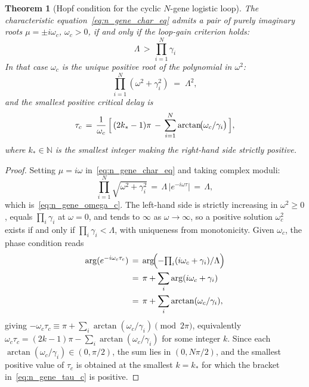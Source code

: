 \documentclass[sn-mathphys,Numbered]{sn-jnl}
\theoremstyle{thmstyleone}
\newtheorem{theorem}{Theorem}
\theoremstyle{thmstyletwo}
\theoremstyle{thmstylethree}
\begin{document}
\begin{theorem}[Hopf condition for the cyclic $N$-gene logistic loop]
\label{thm:n_gene_hopf}
The characteristic equation~\eqref{eq:n_gene_char_eq} admits a pair of
purely imaginary roots $\mu=\pm i\omega_c$, $\omega_c>0$, if and only
if the loop-gain criterion holds:
\begin{equation}
\boxed{\;\Lambda \,>\, \prod_{i=1}^N \gamma_i\;}
\label{eq:n_gene_hopf_crit}
\end{equation}
In that case $\omega_c$ is the unique positive root of the polynomial
in $\omega^2$:
\begin{equation}
\prod_{i=1}^N (\omega^2 + \gamma_i^2) \;=\; \Lambda^2,
\label{eq:n_gene_omega_c}
\end{equation}
and the smallest positive critical delay is
\begin{equation}
\tau_c \,=\, \frac{1}{\omega_c}\,
       \Bigl[\,(2k_*-1)\pi
              \,-\, \sum_{i=1}^N \arctan\!\bigl(\omega_c/\gamma_i\bigr)\,\Bigr],
\label{eq:n_gene_tau_c}
\end{equation}
where $k_*\in\mathbb{N}$ is the smallest integer making the right-hand
side strictly positive.
\end{theorem}
\begin{proof}
Setting $\mu=i\omega$ in~\eqref{eq:n_gene_char_eq} and taking complex
moduli:
\[
\prod_{i=1}^N \sqrt{\omega^2+\gamma_i^2}
\,=\, \Lambda\,\bigl|e^{-i\omega\tau}\bigr|
\,=\, \Lambda,
\]
which is~\eqref{eq:n_gene_omega_c}. The left-hand side is strictly
increasing in $\omega^2\geq 0$, equals $\prod_i\gamma_i$ at $\omega=0$,
and tends to $\infty$ as $\omega\to\infty$, so a positive solution
$\omega_c^2$ exists if and only if
$\prod_i\gamma_i<\Lambda$, with uniqueness from monotonicity. Given
$\omega_c$, the phase condition reads
\begin{align*}
\arg(e^{-i\omega_c\tau_c})
&\,=\, \arg\!\Bigl(-{\textstyle\prod_i}(i\omega_c+\gamma_i)/\Lambda\Bigr)\\
&\,=\, \pi + \sum_i \arg(i\omega_c+\gamma_i)\\
&\,=\, \pi + \sum_i \arctan(\omega_c/\gamma_i),
\end{align*}
giving $-\omega_c\tau_c\equiv \pi+\sum_i\arctan(\omega_c/\gamma_i)
\pmod{2\pi}$, equivalently
$\omega_c\tau_c=(2k-1)\pi-\sum_i\arctan(\omega_c/\gamma_i)$ for some
integer $k$. Since each $\arctan(\omega_c/\gamma_i)\in(0,\pi/2)$, the
sum lies in $(0,N\pi/2)$, and the smallest positive value of $\tau_c$
is obtained at the smallest $k=k_*$ for which the bracket
in~\eqref{eq:n_gene_tau_c} is positive.
\end{proof}
\end{document}
